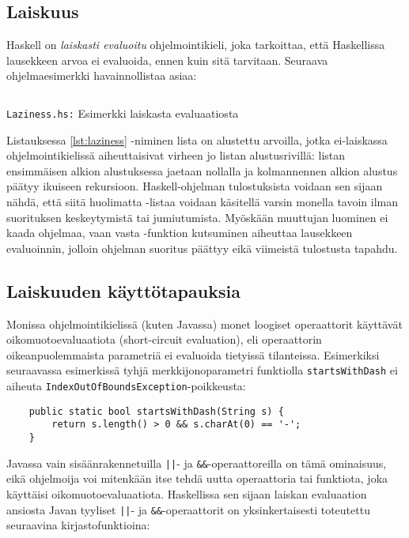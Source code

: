 \subsection{Laiskuus}

Haskell on \emph{laiskasti evaluoitu} ohjelmointikieli,
joka tarkoittaa,
että Haskellissa lausekkeen arvoa ei evaluoida,
ennen kuin sitä tarvitaan.
Seuraava ohjelmaesimerkki havainnollistaa asiaa:

\begin{listing}[H]
    \inputminted{haskell}{codes/Laziness.hs}
    \label{lst:laziness}
    \caption{\texttt{Laziness.hs:} Esimerkki laiskasta evaluaatiosta}
\end{listing}

Listauksessa \ref{lst:laziness} -niminen lista on alustettu arvoilla,
jotka ei-laiskassa ohjelmointikielissä aiheuttaisivat virheen jo listan alustusrivillä:
listan ensimmäisen alkion alustuksessa jaetaan nollalla ja kolmannennen alkion
alustus päätyy ikuiseen rekursioon.
Haskell-ohjelman tulostuksista voidaan sen sijaan nähdä,
että siitä huolimatta -listaa voidaan käsitellä varsin monella
tavoin ilman suorituksen keskeytymistä tai jumiutumista.
Myöskään muuttujan  luominen ei kaada ohjelmaa,
vaan vasta -funktion kutsuminen aiheuttaa lausekkeen
 evaluoinnin, jolloin ohjelman suoritus päättyy
eikä viimeistä tulostusta tapahdu.

\subsection{Laiskuuden käyttötapauksia}

Monissa ohjelmointikielissä (kuten Javassa) monet loogiset operaattorit käyttävät oikomuotoevaluaatiota (short-circuit evaluation),
eli operaattorin oikeanpuolemmaista parametriä ei evaluoida tietyissä tilanteissa.
Esimerkiksi seuraavassa esimerkissä tyhjä merkkijonoparametri funktiolla \texttt{startsWithDash} ei
aiheuta \texttt{IndexOutOfBoundsException}-poikkeusta:

\begin{verbatim}
    public static bool startsWithDash(String s) {
        return s.length() > 0 && s.charAt(0) == '-';
    }
\end{verbatim}

Javassa vain sisäänrakennetuilla \texttt{||}- ja \texttt{\&\&}-operaattoreilla on tämä ominaisuus,
eikä ohjelmoija voi mitenkään itse tehdä uutta operaattoria tai funktiota,
joka käyttäisi oikomuotoevaluaatiota.
Haskellissa sen sijaan laiskan evaluaation ansiosta Javan tyyliset \texttt{||}- ja \texttt{\&\&}-operaattorit on
yksinkertaisesti toteutettu seuraavina kirjastofunktioina:

